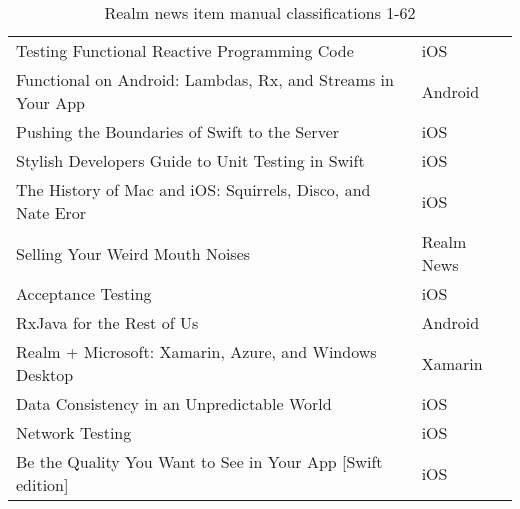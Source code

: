 \documentclass[letterpaper,11pt]{article}
\begin{document}
\begin{table}[h]
\begin{adjustbox}{max width=\linewidth}
\begin{tabular}{ | l | l |}
Testing Functional Reactive Programming Code & iOS \\
Functional on Android: Lambdas, Rx, and Streams in Your App & Android \\
Pushing the Boundaries of Swift to the Server & iOS \\
Stylish Developers Guide to Unit Testing in Swift & iOS \\
The History of Mac and iOS: Squirrels, Disco, and Nate Eror & iOS \\
Selling Your Weird Mouth Noises & Realm News \\
Acceptance Testing & iOS \\
RxJava for the Rest of Us & Android \\
Realm + Microsoft: Xamarin, Azure, and Windows Desktop & Xamarin \\
Data Consistency in an Unpredictable World & iOS \\
Network Testing & iOS \\
Be the Quality You Want to See in Your App [Swift edition] & iOS \\
\hline
\end{tabular}
\end{adjustbox}
\caption{Realm news item manual classifications 1-62}
\label{table:q1mclass1}
\end{table}
\end{document}
